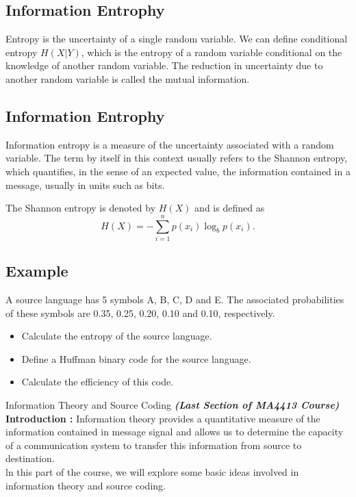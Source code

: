 {
	\subsection{Information Entrophy}
	Entropy is the uncertainty of a single random variable. We can
	define conditional entropy $H(X|Y)$, which is the entropy of a
	random variable conditional on the knowledge of another random
	variable. The reduction in uncertainty due to another random
	variable is called the mutual information.
}

{
	\subsection{Information Entrophy}
	Information entropy is a measure of the uncertainty associated
	with a random variable. The term by itself in this context usually
	refers to the Shannon entropy, which quantifies, in the sense of
	an expected value, the information contained in a message, usually
	in units such as bits.
	
	The Shannon entropy is denoted by $H(X)$ and is defined as
	\begin{equation}
	H(X) =   - \sum_{i=1}^np(x_i)\log_b p(x_i).
	\end{equation}
}




{
	\subsection{Example}
	
	A source language has 5 symbols A, B, C, D and E.  The associated
	probabilities of these symbols are 0.35, 0.25, 0.20, 0.10 and
	0.10, respectively.
	
	\begin{itemize}
		\item Calculate the entropy of the source language. \item Define a
		Huffman binary code for the source language. \item Calculate the
		efficiency of this code.
	\end{itemize}
}


\newpage
{Information Theory and Source Coding}
\textbf{\textit{(Last Section of MA4413 Course)}}\\
\bigskip
\textbf{Introduction : } Information theory provides a quantitative measure of the information contained in message signal and allows us to determine the capacity of a communication system to transfer this information from source to destination. \\ \bigskip ln this part of the course, we will explore some basic ideas involved in information theory and source coding.




